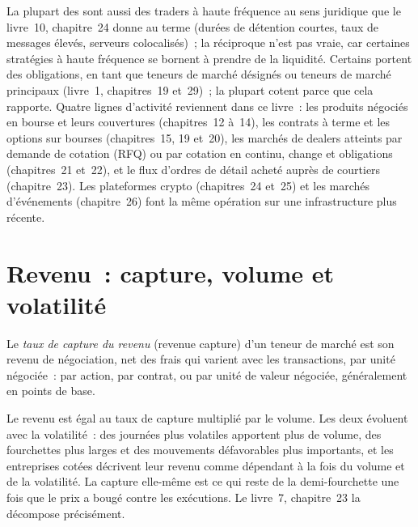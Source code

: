 La plupart des  sont aussi des traders à haute fréquence au sens juridique que le livre~10, chapitre~24 donne au terme (durées de
détention courtes, taux de messages élevés, serveurs colocalisés)~; la réciproque n'est pas vraie, car certaines stratégies à haute fréquence se bornent à prendre de la liquidité. Certains 
portent des obligations, en tant que teneurs de marché désignés ou teneurs de marché principaux (livre~1, chapitres~19 et~29)~; la plupart cotent parce que cela rapporte. Quatre lignes d'activité
reviennent dans ce livre~: les produits négociés en bourse et leurs couvertures (chapitres~12 à~14), les contrats à terme et les options sur bourses (chapitres~15, 19 et~20), les
marchés de dealers atteints par demande de cotation (RFQ) ou par cotation en continu, change et obligations (chapitres~21 et~22), et le flux d'ordres de détail acheté auprès de courtiers (chapitre~23).
Les plateformes crypto (chapitres~24 et~25) et les marchés d'événements (chapitre~26) font la même opération sur une infrastructure plus récente.

\section{Revenu~: capture, volume et volatilité}

\begin{definition}\label{def:hf:the-business-of-market-making:capture}
Le \emph{taux de capture du revenu} (revenue capture) d'un teneur de marché est son revenu de négociation, net des frais qui varient avec les transactions, par unité négociée~: par
action, par contrat, ou par unité de valeur négociée, généralement en points de base.
\end{definition}

Le revenu est égal au taux de capture multiplié par le volume. Les deux évoluent avec la volatilité~: des journées plus volatiles apportent plus de volume, des fourchettes plus larges et des mouvements défavorables plus importants, et les
entreprises cotées décrivent leur revenu comme dépendant à la fois du volume et de la volatilité. La capture elle-même est ce qui reste de la demi-fourchette une fois que le prix
a bougé contre les exécutions. Le livre~7, chapitre~23 la décompose précisément.

